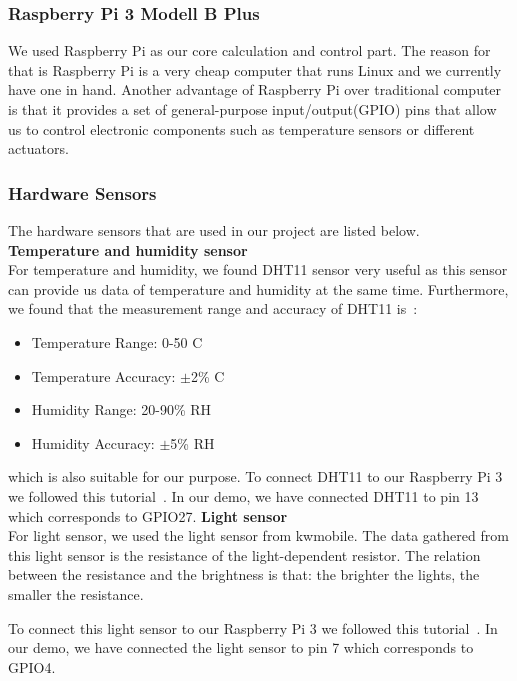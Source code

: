 \documentclass[runningheads]{llncs}
\begin{document}
\subsubsection{Raspberry Pi 3 Modell B Plus}\hfill
\label{hard_imp:pi3}
\newline
We used Raspberry Pi as our core calculation and control part. The reason for that is Raspberry Pi is a very cheap computer that runs Linux and we currently have one in hand. Another advantage of Raspberry Pi over traditional computer is that it provides a set of general-purpose input/output(GPIO) pins that allow us to control electronic components such as temperature sensors or different actuators.

\subsubsection{Hardware Sensors}\hfill
\label{hard_imp:sensor}
\newline
The hardware sensors that are used in our project are listed below.
\newline
\textbf{Temperature and humidity sensor~\cite{th_sensor}}\\
For temperature and humidity, we found DHT11 sensor very useful as this sensor can provide us data of temperature and humidity at the same time. Furthermore, we found that the measurement range and accuracy of DHT11 is~\cite{th_data}:
\begin{itemize}
\item Temperature Range: 0-50 \textdegree{}C
\item Temperature Accuracy: $\pm$2\% \textdegree{}C 
\item Humidity Range: 20-90\% RH
\item Humidity Accuracy: $\pm$5\% RH
\end{itemize}
which is also suitable for our purpose. To connect DHT11 to our Raspberry Pi 3 we followed this tutorial~\cite{th_tutorial}. In our demo, we have connected DHT11 to pin 13 which corresponds to GPIO27.
\newline
\textbf{Light sensor~\cite{l_sensor}}\\
For light sensor, we used the light sensor from kwmobile. The data gathered from this light sensor is the resistance of the light-dependent resistor. The relation between the resistance and the brightness is that: the brighter the lights, the smaller the resistance.

To connect this light sensor to our Raspberry Pi 3 we followed this tutorial~\cite{l_tutorial}. In our demo, we have connected the light sensor to pin 7 which corresponds to GPIO4.
\end{document}
